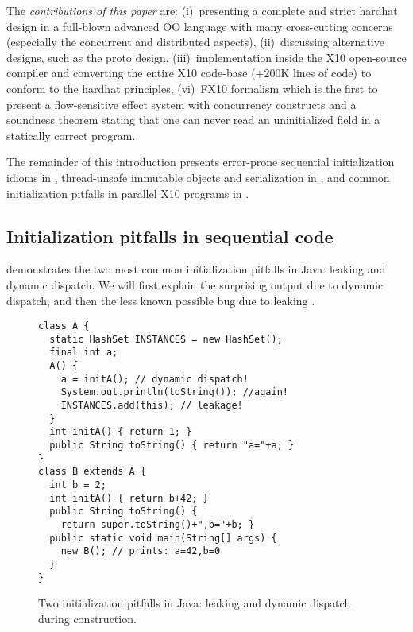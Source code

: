 The \emph{contributions of this paper} are:
    (i)~presenting a complete and strict hardhat design in a
        full-blown advanced OO language with many cross-cutting concerns
        (especially the concurrent and distributed aspects),
    (ii)~discussing alternative designs, such as the proto design,
    (iii)~implementation inside the X10 open-source compiler and
        converting the entire X10 code-base (+200K lines of code) %
        to conform to the hardhat principles,
    (vi)~FX10 formalism which is the first to present a flow-sensitive effect system with concurrency constructs
    and a soundness theorem stating that one can never read an
    uninitialized field in a statically correct  program.


The remainder of this introduction
    presents error-prone sequential initialization idioms in ,
    thread-unsafe immutable objects and serialization in , and
    common initialization pitfalls in parallel X10 programs in .

\vspace{-0.1cm} %
\subsection{Initialization pitfalls in sequential code}
\label{Section:Initialization-pitfalls}

 demonstrates the two most common initialization pitfalls in Java:
    leaking \this and dynamic dispatch.
We will first explain the surprising output due to dynamic dispatch,
    and then the less known possible bug due to leaking \this.

\begin{figure}
\vspace{-0.2cm}\begin{lstlisting}
class A {
  static HashSet INSTANCES = new HashSet();
  final int a;
  A() {
    a = initA(); // dynamic dispatch!
    System.out.println(toString()); //again!
    INSTANCES.add(this); // leakage!
  }
  int initA() { return 1; }
  public String toString() { return "a="+a; }
}
class B extends A {
  int b = 2;
  int initA() { return b+42; }
  public String toString() {
    return super.toString()+",b="+b; }
  public static void main(String[] args) {
    new B(); // prints: a=42,b=0
  }
}
\end{lstlisting}\vspace{-0.2cm}
\caption{Two initialization pitfalls in Java:
    leaking \this and dynamic dispatch during construction.}
\label{Figure:TwoPitfalls}
\end{figure}


